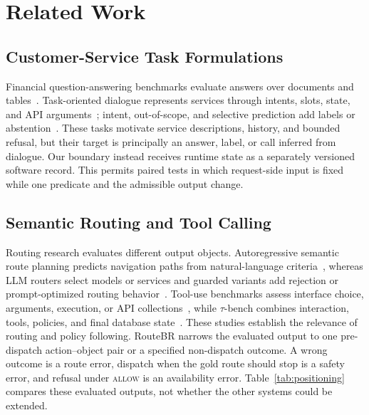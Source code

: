 \documentclass[10pt,conference,a4paper]{IEEEtran}
\newcommand{\method}{RouteBR}
\begin{document}
\section{Related Work}

\subsection{Customer-Service Task Formulations}

Financial question-answering benchmarks evaluate answers over documents and tables~\cite{chen2021finqa,islam2023financebench}. Task-oriented dialogue represents services through intents, slots, state, and API arguments~\cite{eric2020multiwoz,rastogi2020towards,byrne2019taskmaster}; intent, out-of-scope, and selective prediction add labels or abstention~\cite{casanueva2020efficient,larson2019evaluation,geifman2017selective,hendrickx2024machine}. These tasks motivate service descriptions, history, and bounded refusal, but their target is principally an answer, label, or call inferred from dialogue. Our boundary instead receives runtime state as a separately versioned software record. This permits paired tests in which request-side input is fixed while one predicate and the admissible output change.

\subsection{Semantic Routing and Tool Calling}

Routing research evaluates different output objects. Autoregressive semantic route planning predicts navigation paths from natural-language criteria~\cite{zhao2024semantic}, whereas LLM routers select models or services and guarded variants add rejection or prompt-optimized routing behavior~\cite{ong2025routellm,vsleher2025guarded,vsleher2026influence}. Tool-use benchmarks assess interface choice, arguments, execution, or API collections~\cite{li2023api,qin2024toolllm,zhuang2023toolqa,patil2024gorilla}, while $\tau$-bench combines interaction, tools, policies, and final database state~\cite{yao2024tau}. These studies establish the relevance of routing and policy following. \method{} narrows the evaluated output to one pre-dispatch action--object pair or a specified non-dispatch outcome. A wrong outcome is a route error, dispatch when the gold route should stop is a safety error, and refusal under \textsc{allow} is an availability error. Table~\ref{tab:positioning} compares these evaluated outputs, not whether the other systems could be extended.
\end{document}

